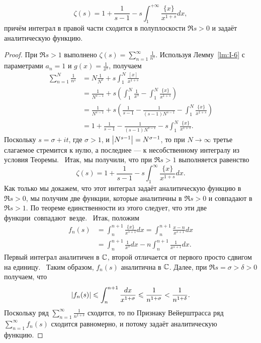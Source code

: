 \begin{ntheorem}
\label{thm:I-5}
    \[
        \zeta(s) = 1 + \frac{1}{s - 1} - s \int_{1}^{+\infty} \frac{\{x\}}{x^{1+s}}dx,
    \]
    причём интеграл в правой части сходится в полуплоскости $\Re{s} > 0$ и задаёт аналитическую функцию.
\end{ntheorem}
\begin{proof}
    При $\Re{s} > 1$ выполнено $\zeta(s) = \sum_{n = 1}^{\infty} \frac{1}{n^s}$. Используя Лемму~\ref{lm:I-6} с параметрами $a_n = 1$ и $g(x) = \frac{1}{x^s}$, получаем
    \begin{align*}
        \sum_{n = 1}^{N} \frac{1}{n^s} 
        &= N \frac{1}{N^s} + s \int_{1}^{N}\frac{\left[ x \right]}{x^{1 + s}} \\
        &= \frac{1}{N^{s - 1}} + s \left( \int_{1}^{N}\frac{1}{x^s} - \int_{1}^{N}\frac{\{x\}}{x^{1 + s}}\right) \\
        &= \frac{1}{N^{s - 1}} + s \left( \frac{1}{s - 1} - \frac{1}{(s - 1)N^{s - 1}} - \int_{1}^{N}\frac{\{x\}}{x^{1 + s}}\right) \\
        &= 1 + \frac{1}{s - 1} - \frac{1}{(s - 1)N^{s - 1}} - s \int_{1}^{N}\frac{\{x\}}{x^{1 + s}}.
    \end{align*}
    Поскольку $s = \sigma + it$, где $\sigma > 1$, и $\left| N^{s-1} \right| = N^{\sigma-1}$, то при $N \to \infty$ третье слагаемое стремится к нулю, а последнее --- к несобственному интегралу из условия Теоремы.~\newline
    Итак, мы получили, что при $\Re{s} > 1$ выполняется равенство
    \[
        \zeta(s) = 1 + \frac{1}{s-1} - s\int_{1}^{\infty} \frac{\{x\}}{x^{1+s}}dx.
    \]
    Как только мы докажем, что этот интеграл задаёт аналитическую функцию в $\Re{s} > 0$, мы получим две функции, которые аналитичны в $\Re{s} > 0$ и совпадают в $\Re{s} > 1$. По теореме единственности из этого следует, что эти две функции~совпадают~везде.~\newline
    Итак, положим
    \begin{align*}
        f_n(s) &=
        \int_{n}^{n+1} \frac{\{x\}}{x^{s+1}}dx = \int_{n}^{n+1} \frac{x-n}{x^{s+1}}dx \\
        &= \int_{n}^{n+1} \frac{1}{x^{s}}dx - n\int_{n}^{n+1} \frac{1}{x^{s+1}}dx.
    \end{align*}
    Первый интеграл аналитичен в $\mathbb{C}$, второй отличается от первого просто сдвигом на единицу.~\newline
    Таким образом, $f_n(s)$ аналитична в $\mathbb{C}$. Далее, при $\Re{s} = \sigma > \delta > 0$ получаем, что
    \[
        \left| f_n(s) \right| 
        \leqslant \int_{n}^{n + 1} \frac{dx}{x^{1+\sigma}} 
        \leqslant \frac{1}{n^{1+\sigma}} 
        < \frac{1}{n^{1+\delta}}.
    \]
    Поскольку ряд $\sum_{n = 1}^{\infty} \frac{1}{n^{1 + \delta}}$ сходится, то по Признаку Вейерштрасса ряд $\sum_{n = 1}^{\infty} f_n(s)$ сходится равномерно, и потому задаёт аналитическую функцию.
\end{proof}

